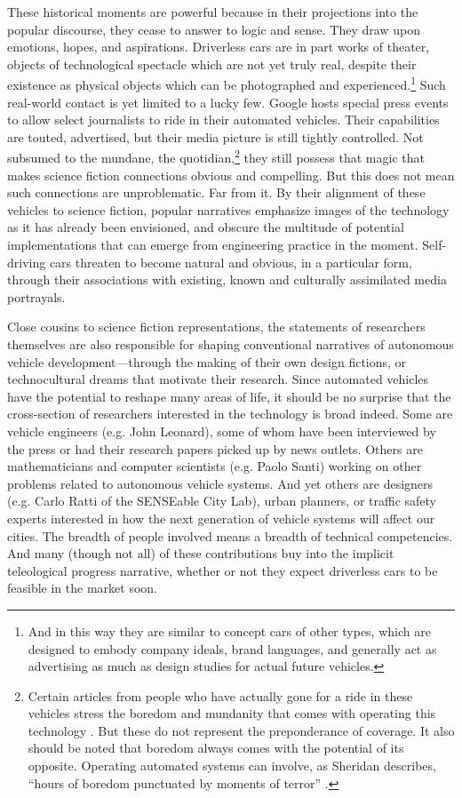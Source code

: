 These historical moments are powerful because in their projections into the
popular discourse, they cease to answer to logic and
sense. They draw upon emotions, hopes, and aspirations. Driverless cars
are in part works of theater, objects of technological spectacle which
are not yet truly real, despite their existence as physical objects
which can be photographed and experienced.\footnote{And in this way
  they are similar to concept cars of other types, which are designed
  to embody company ideals, brand languages, and generally act as
  advertising as much as design studies for actual future vehicles.}
Such real-world contact is 
yet limited to a lucky few. Google hosts special press events to allow
select journalists
to ride in their automated vehicles. Their capabilities are touted,
advertised, but their media picture is still tightly controlled. Not subsumed
to the mundane, the quotidian,\footnote{Certain articles from people
  who have actually gone for a ride in these vehicles stress the
  boredom and mundanity that comes with operating this
  technology \cite{rode500}. But these do not represent the
  preponderance of coverage. It also should be noted that boredom
  always comes with the potential of its opposite. Operating automated
systems can involve, as Sheridan describes, ``hours of boredom
punctuated by moments of terror'' \cite[p. 339]{sheridan}.} they still
possess that magic that 
makes science fiction connections obvious and compelling. But this
does not mean such connections are unproblematic. Far from it. By
their alignment of these vehicles to science fiction, popular
narratives emphasize images of the technology as it has already been
envisioned, and obscure the multitude of potential implementations
that can emerge from engineering practice in the moment. Self-driving
cars threaten to become natural and obvious, in a particular form,
through their associations with existing, known and culturally
assimilated media portrayals.

Close cousins to science fiction representations, the statements of
researchers themselves are also responsible for 
shaping conventional narratives of autonomous vehicle
development---through the making of their own design fictions, or
technocultural dreams that motivate their research.
Since automated vehicles have the potential to reshape many areas of life, it should
be no surprise that the cross-section of researchers interested in the
technology is broad indeed. Some are vehicle engineers (e.g. John Leonard), some of whom have been
interviewed by the press or had their research papers picked up by news outlets.
Others are mathematicians and
computer scientists (e.g. Paolo Santi) working on other problems related to
autonomous vehicle systems. And yet others are designers (e.g. Carlo
Ratti of the SENSEable City Lab), urban
planners, or traffic safety experts interested in how the next
generation of vehicle systems will
affect our cities. The breadth of people involved means a breadth of
technical competencies. And many (though not all) of these contributions buy into the
implicit teleological progress narrative, whether or not they expect
driverless cars to be feasible in the market soon.

